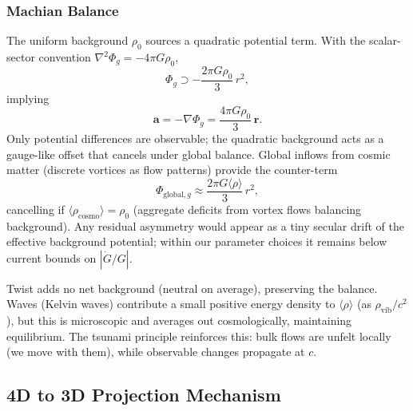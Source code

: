 \subsubsection{Machian Balance}
The uniform background $\rho_0$ sources a quadratic potential term. With the scalar-sector convention $\nabla^2 \Phi_g=-4\pi G\rho_0$,
\begin{equation}
\Phi_g \supset -\frac{2\pi G \rho_0}{3}\,r^2,
\end{equation}
implying
\begin{equation}
\mathbf{a} = -\nabla \Phi_g = \frac{4\pi G \rho_0}{3}\,\mathbf{r}.
\end{equation}
Only potential differences are observable; the quadratic background acts as a gauge-like offset that cancels under global balance. Global inflows from cosmic matter (discrete vortices as flow patterns) provide the counter-term
\begin{equation}
\Phi_{\text{global},g} \approx \frac{2\pi G \langle \rho \rangle}{3}\, r^2,
\end{equation}
cancelling if $\langle \rho_{\text{cosmo}} \rangle = \rho_0$ (aggregate deficits from vortex flows balancing background). Any residual asymmetry would appear as a tiny secular drift of the effective background potential; within our parameter choices it remains below current bounds on $|\dot G/G|$.

Twist adds no net background (neutral on average), preserving the balance. Waves (Kelvin waves) contribute a small positive energy density to $\langle \rho \rangle$ (as $\rho_{\text{vib}}/c^2$), but this is microscopic and averages out cosmologically, maintaining equilibrium. The tsunami principle reinforces this: bulk flows are unfelt locally (we move with them), while observable changes propagate at $c$.

\medskip
{}
\medskip

\subsection{4D to 3D Projection Mechanism}

